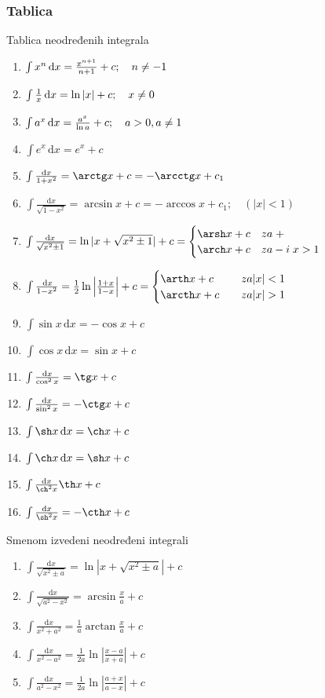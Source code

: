 \subsubsection{Tablica}
	Tablica neodređenih integrala
	\begin{enumerate}[label = \arabic*)]
		\item $\int x^n\, \mathrm{d}x = \frac{x^{n+1}}{n+1}+c; \quad n \centernot = -1$
		\item $\int \frac{1}{x}\, \mathrm{d}x = \ln |x| + c; \quad x \centernot = 0$
		\item $\int a^x \, \mathrm{d}x = \frac{a^x}{\ln a} + c; \quad a>0, a \centernot = 1$
		\item $\int e^x \, \mathrm{d}x = e^x + c$
		\item $\int \frac{\mathrm{d}x}{1+x^2} = \arctg x + c = - \arcctg x + c_1$
		\item $\int \frac{\mathrm{d}x}{\sqrt{1 - x^2}} = \arcsin x + c = - \arccos x + c_1; \quad (|x| < 1)$
		\item $\int \frac{\mathrm{d}x}{\sqrt{x^2 \pm 1}} = \ln |x+\sqrt{x^2 \pm 1}| + c = 
		\begin{cases}
			\arsh x + c \quad za \; +\\
			\arch x + c \quad za - i \; x > 1
		\end{cases}$
		\item $\int \frac{\, \mathrm{d}x}{1-x^2} = \frac{1}{2}\ln \left | \frac{1 + x}{1 - x} \right | + c = 
		\begin{cases}
			\arth x + c &\quad za |x|<1\\
			\arcth x + c &\quad za |x|> 1
		\end{cases}$
		\item $\int \sin x \, \mathrm{d}x = - \cos x + c$
		\item $\int \cos x \, \mathrm{d}x = \sin x + c$
		\item $\int \frac{\mathrm{d}x}{\cos^2 x} = \tg x + c$
		\item $\int \frac{\mathrm{d}x}{\sin^2 x} = - \ctg x + c$
		\item $\int \sh x \, \mathrm{d}x = \ch x + c$
		\item $\int \ch x \, \mathrm{d}x = \sh x + c$
		\item $\int \frac{\mathrm{d}x}{\ch^2 x} \th x + c$
		\item $\int \frac{\mathrm{d}x}{\sh^2 x} = -\cth x + c$
	\end{enumerate}
	Smenom izvedeni neodređeni integrali
	\begin{enumerate}[label = \arabic*)]
		\item $\int \frac{\mathrm{d}x}{\sqrt{x^2 \pm a}} = \ln |x + \sqrt{x^2 \pm a}| + c$
		\item $\int \frac{\mathrm{d}x}{\sqrt{a^2 - x^2}} = \arcsin \frac{x}{a} + c$
		\item $\int \frac{\mathrm{d}x}{x^2+a^2} = \frac{1}{a}\arctan\frac{x}{a} + c$
		\item $\int \frac{\mathrm{d}x}{x^2-a^2} = \frac{1}{2a}\ln\left | \frac{x-a}{x+a} \right | + c$
		\item $\int \frac{\mathrm{d}x}{a^2 - x^2} = \frac{1}{2a} \ln \left | \frac{a+x}{a-x} \right | + c$
	\end{enumerate}
	
